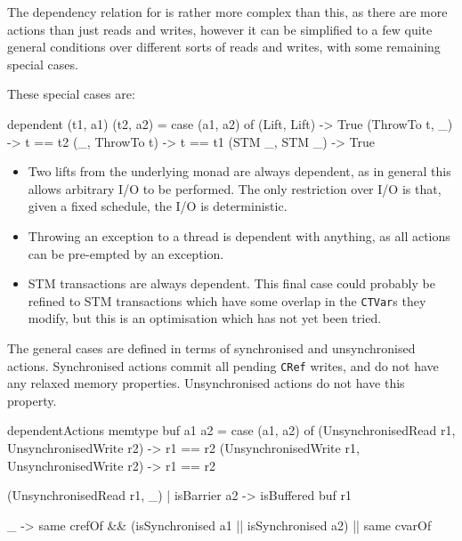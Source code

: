 The dependency relation for \dejafu{} is rather more complex than
this, as there are more actions than just reads and writes, however it
can be simplified to a few quite general conditions over different
sorts of reads and writes, with some remaining special cases.

These special cases are:

\begin{haskellcode}
dependent (t1, a1) (t2, a2) = case (a1, a2) of
  (Lift, Lift)   -> True
  (ThrowTo t, _) -> t == t2
  (_, ThrowTo t) -> t == t1
  (STM _, STM _) -> True
\end{haskellcode}

\begin{itemize}
\item Two lifts from the underlying monad are always dependent, as in
  general this allows arbitrary I/O to be performed. The only
  restriction over I/O is that, given a fixed schedule, the I/O is
  deterministic.

\item Throwing an exception to a thread is dependent with anything, as
  all actions can be pre-empted by an exception.

\item STM transactions are always dependent. This final case could
  probably be refined to STM transactions which have some overlap in
  the \verb|CTVar|s they modify, but this is an optimisation which has
  not yet been tried.
\end{itemize}

The general cases are defined in terms of synchronised and
unsynchronised actions. Synchronised actions commit all pending
\verb|CRef| writes, and do not have any relaxed memory
properties. Unsynchronised actions do not have this property.

\begin{haskellcode}
dependentActions memtype buf a1 a2 = case (a1, a2) of
  (UnsynchronisedRead  r1, UnsynchronisedWrite r2)
    -> r1 == r2
  (UnsynchronisedWrite r1, UnsynchronisedWrite r2)
    -> r1 == r2

  (UnsynchronisedRead r1, _)
    | isBarrier a2 -> isBuffered buf r1

  _ ->
    same crefOf && (isSynchronised a1 || isSynchronised a2)
    || same cvarOf
\end{haskellcode}

